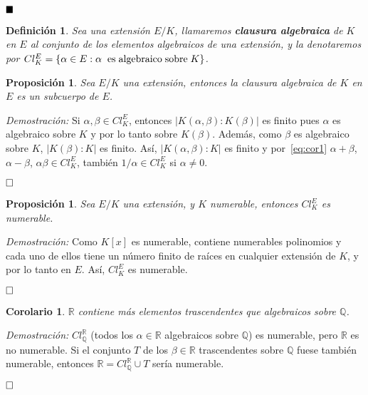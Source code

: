 \documentclass[12pt]{article}
\newtheorem{proposition}[theorem]{Proposición}
\newtheorem{definition}[theorem]{Definición}
\newtheorem{corolario}{Corolario}[theorem]
\begin{document}
$\hfill \blacksquare$

\begin{definition} Sea una extensión $E/K$, llamaremos \textbf{clausura algebraica} de $K$ en $E$ al conjunto de los elementos algebraicos de una extensión, y la denotaremos por $Cl_{K}^{E} = \lbrace \alpha \in E: \alpha \hspace{0.2cm} \text{es} \hspace{0.1cm} \text{algebraico} \hspace{0.1cm} \text{sobre} \hspace{0.1cm} K \rbrace$.
\end{definition} 

\begin{proposition} Sea $E/K$ una extensión, entonces la clausura algebraica de $K$ en $E$ es un subcuerpo de $E$.
\end{proposition}
\emph{Demostración: } Si $\alpha, \beta \in Cl_{K}^{E}$, entonces $|K(\alpha, \beta) : K(\beta) |$ es finito pues $\alpha$ es algebraico sobre $K$ y por lo tanto sobre $K(\beta)$. Además, como $\beta$ es algebraico sobre $K$, $|K(\beta) : K|$ es finito. Así, $|K(\alpha, \beta) : K|$ es finito y por~\ref{eq:cor1} $\alpha + \beta$, $\alpha - \beta$, $\alpha \beta \in Cl_{K}^{E}$, también $1/\alpha \in Cl_{K}^{E}$ si $\alpha \neq 0$.

$\hfill \square$

\begin{proposition}Sea $E/K$ una extensión, y $K$ numerable, entonces $Cl_{K}^{E}$ es numerable.
\end{proposition}
\emph{Demostración: } Como $K[x]$ es numerable, contiene numerables polinomios y cada uno de ellos tiene un número finito de raíces en cualquier extensión de $K$, y por lo tanto en $E$. Así, $Cl_{K}^{E}$ es numerable.

$\hfill \square$

\begin{corolario} $\mathbb{R}$ contiene más elementos trascendentes que algebraicos sobre $\mathbb{Q}$.
\end{corolario}
\emph{Demostración: }$Cl_{\mathbb{Q}}^{\mathbb{R}}$ (todos los $\alpha \in \mathbb{R}$ algebraicos sobre $\mathbb{Q}$) es numerable, pero $\mathbb{R}$ es no numerable. Si el conjunto $T$ de los $\beta	 \in \mathbb{R}$ trascendentes sobre $\mathbb{Q}$ fuese también numerable, entonces $\mathbb{R} = Cl_{\mathbb{Q}}^{\mathbb{R}} \cup T$ sería numerable.

$\hfill \square$
\end{document}
